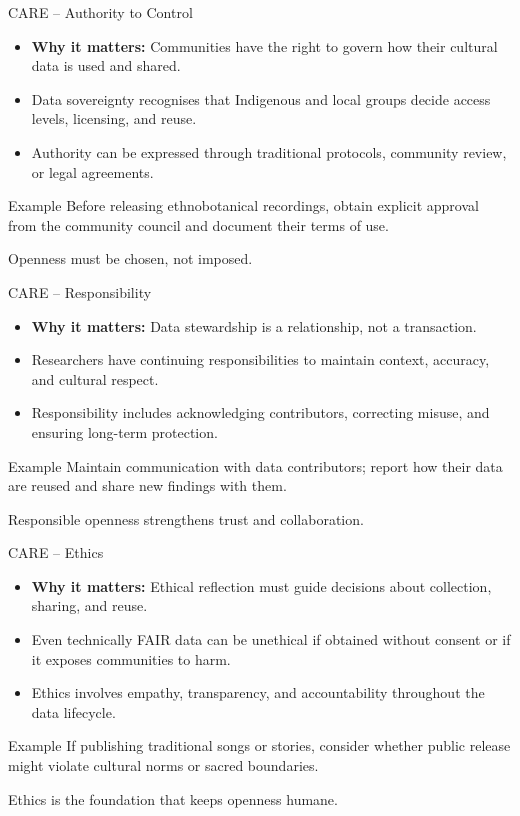 \documentclass[aspectratio=169]{beamer}
\begin{document}
\begin{frame}{CARE – Authority to Control}
\begin{itemize}
  \item \textbf{Why it matters:} Communities have the right to govern how their cultural data is used and shared.  
  \item Data sovereignty recognises that Indigenous and local groups decide access levels, licensing, and reuse.  
  \item Authority can be expressed through traditional protocols, community review, or legal agreements.
\end{itemize}
\begin{exampleblock}{Example}
Before releasing ethnobotanical recordings, obtain explicit approval from the community council and document their terms of use.
\end{exampleblock}
Openness must be chosen, not imposed.
\end{frame}

\begin{frame}{CARE – Responsibility}
\begin{itemize}
  \item \textbf{Why it matters:} Data stewardship is a relationship, not a transaction.  
  \item Researchers have continuing responsibilities to maintain context, accuracy, and cultural respect.  
  \item Responsibility includes acknowledging contributors, correcting misuse, and ensuring long-term protection.
\end{itemize}
\begin{exampleblock}{Example}
Maintain communication with data contributors; report how their data are reused and share new findings with them.
\end{exampleblock}
Responsible openness strengthens trust and collaboration.
\end{frame}

\begin{frame}{CARE – Ethics}
\begin{itemize}
  \item \textbf{Why it matters:} Ethical reflection must guide decisions about collection, sharing, and reuse.  
  \item Even technically FAIR data can be unethical if obtained without consent or if it exposes communities to harm.  
  \item Ethics involves empathy, transparency, and accountability throughout the data lifecycle.
\end{itemize}
\begin{exampleblock}{Example}
If publishing traditional songs or stories, consider whether public release might violate cultural norms or sacred boundaries.
\end{exampleblock}
Ethics is the foundation that keeps openness humane.
\end{frame}
\end{document}
